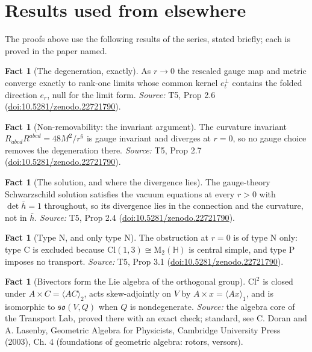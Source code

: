 \documentclass[11pt]{article}
\theoremstyle{definition}
\newtheorem{fact}[theorem]{Fact}
\theoremstyle{plain}
\providecommand{\Cl}{}\renewcommand{\Cl}{\mathrm{Cl}}
\providecommand{\HH}{}\renewcommand{\HH}{\mathbb{H}}
\providecommand{\Mat}{}\renewcommand{\Mat}{\mathrm{M}}
\providecommand{\er}{}\renewcommand{\er}{e_r}
\providecommand{\et}{}\renewcommand{\et}{e_t}
\providecommand{\hb}{}\renewcommand{\hb}{\bar{h}}
\providecommand{\so}{}\renewcommand{\so}{\mathfrak{so}}
\begin{document}
\section{Results used from elsewhere}
The proofs above use the following results of the series, stated briefly; each is proved in the paper named.

\begin{fact}[The degeneration, exactly]\label{c:singularity.degeneration-exactly}
As $r \to 0$ the rescaled gauge map and metric converge exactly to rank-one limits whose common kernel $\et^{\perp}$ contains the folded direction $\er$, null for the limit form.
\emph{Source:} T5, Prop 2.6 (\href{https://doi.org/10.5281/zenodo.22721790}{doi:10.5281/zenodo.22721790}).
\end{fact}

\begin{fact}[Non-removability: the invariant argument]\label{c:singularity.non-removability-invariant-argument}
The curvature invariant $R_{abcd}R^{abcd} = 48M^2/r^6$ is gauge invariant and diverges at $r = 0$, so no gauge choice removes the degeneration there.
\emph{Source:} T5, Prop 2.7 (\href{https://doi.org/10.5281/zenodo.22721790}{doi:10.5281/zenodo.22721790}).
\end{fact}

\begin{fact}[The solution, and where the divergence lies]\label{c:singularity.solution-where-divergence-lies}
The gauge-theory Schwarzschild solution satisfies the vacuum equations at every $r > 0$ with $\det \hb = 1$ throughout, so its divergence lies in the connection and the curvature, not in $\hb$.
\emph{Source:} T5, Prop 2.4 (\href{https://doi.org/10.5281/zenodo.22721790}{doi:10.5281/zenodo.22721790}).
\end{fact}

\begin{fact}[Type N, and only type N]\label{c:singularity.type-n-only-type-n}
The obstruction at $r = 0$ is of type N only: type C is excluded because $\Cl(1,3) \cong \Mat_2(\HH)$ is central simple, and type P imposes no transport.
\emph{Source:} T5, Prop 3.1 (\href{https://doi.org/10.5281/zenodo.22721790}{doi:10.5281/zenodo.22721790}).
\end{fact}

\begin{fact}[Bivectors form the Lie algebra of the orthogonal group]\label{c:std-algebra.bivector-lie-algebra}
$\Cl^{2}$ is closed under $A \times C = \langle AC \rangle_2$, acts skew-adjointly on $V$ by $A \times x = \langle Ax \rangle_1$, and is isomorphic to $\so(V,Q)$ when $Q$ is nondegenerate.
\emph{Source:} the algebra core of the Transport Lab, proved there with an exact check; standard, see C. Doran and A. Lasenby, Geometric Algebra for Physicists, Cambridge University Press (2003), Ch. 4 (foundations of geometric algebra: rotors, versors).
\end{fact}
\end{document}
